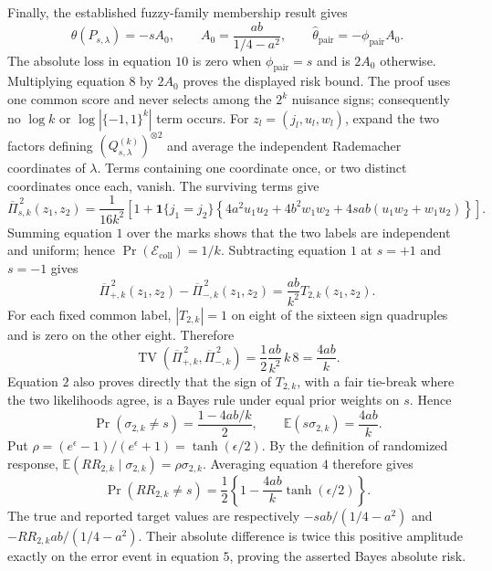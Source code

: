 Finally, the established fuzzy-family membership result gives
\[
 \theta(P_{s,\lambda})=-sA_0,
 \qquad
 A_0=\frac{ab}{1/4-a^2},
 \qquad
 \widehat\theta_{\mathrm{pair}}=-\phi_{\mathrm{pair}}A_0. \tag{10}
\]
The absolute loss in equation \(10\) is zero when \(\phi_{\mathrm{pair}}=s\) and is \(2A_0\) otherwise.  Multiplying equation \(8\) by \(2A_0\) proves the displayed risk bound.  The proof uses one common score and never selects among the \(2^k\) nuisance signs; consequently no \(\log k\) or \(\log|\{-1,1\}^k|\) term occurs.
For \(z_l=(j_l,u_l,w_l)\), expand the two factors defining \((Q_{s,\lambda}^{(k)})^{\otimes2}\) and average the independent Rademacher coordinates of \(\lambda\).  Terms containing one coordinate once, or two distinct coordinates once each, vanish.  The surviving terms give
\[
 \overline\Pi_{s,k}^{\,2}(z_1,z_2)
 =\frac1{16k^2}\left[1+\mathbf 1\{j_1=j_2\}
 \left\{4a^2u_1u_2+4b^2w_1w_2
 +4sab(u_1w_2+w_1u_2)\right\}\right]. \tag{1}
\]
Summing equation \(1\) over the marks shows that the two labels are independent and uniform; hence \(\Pr(\mathcal E_{\mathrm{coll}})=1/k\).  Subtracting equation \(1\) at \(s=+1\) and \(s=-1\) gives
\[
 \overline\Pi_{+,k}^{\,2}(z_1,z_2)
 -\overline\Pi_{-,k}^{\,2}(z_1,z_2)
 =\frac{ab}{k^2}T_{2,k}(z_1,z_2). \tag{2}
\]
For each fixed common label, \(|T_{2,k}|=1\) on eight of the sixteen sign quadruples and is zero on the other eight.  Therefore
\[
 \operatorname{TV}(\overline\Pi_{+,k}^{\,2},\overline\Pi_{-,k}^{\,2})
 =\frac12\frac{ab}{k^2}\,k\,8=\frac{4ab}{k}. \tag{3}
\]
Equation \(2\) also proves directly that the sign of \(T_{2,k}\), with a fair tie-break where the two likelihoods agree, is a Bayes rule under equal prior weights on \(s\).  Hence
\[
 \Pr(\sigma_{2,k}\ne s)=\frac{1-4ab/k}{2},
 \qquad
 \mathbb E(s\sigma_{2,k})=\frac{4ab}{k}. \tag{4}
\]
Put \(\rho=(e^\epsilon-1)/(e^\epsilon+1)=\tanh(\epsilon/2)\).  By the definition of randomized response,
\(\mathbb E(RR_{2,k}\mid\sigma_{2,k})=\rho\sigma_{2,k}\).  Averaging equation \(4\) therefore gives
\[
 \Pr(RR_{2,k}\ne s)
 =\frac12\left\{1-\frac{4ab}{k}\tanh(\epsilon/2)\right\}. \tag{5}
\]
The true and reported target values are respectively
\(-sab/(1/4-a^2)\) and \(-RR_{2,k}ab/(1/4-a^2)\).  Their absolute difference is twice this positive amplitude exactly on the error event in equation \(5\), proving the asserted Bayes absolute risk.

